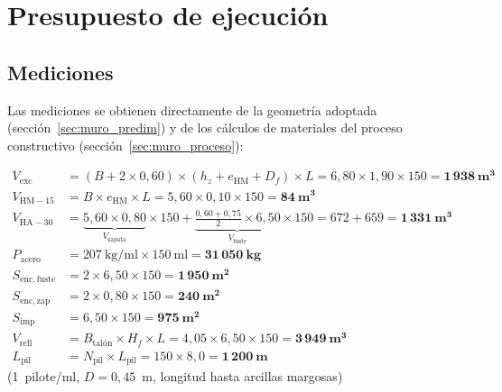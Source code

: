 \section{Presupuesto de ejecución}
\label{sec:muro_presupuesto}

\subsection{Mediciones}
\label{subsec:mediciones}

Las mediciones se obtienen directamente de la geometría adoptada
(sección~\ref{sec:muro_predim}) y de los cálculos de materiales
del proceso constructivo (sección~\ref{sec:muro_proceso}):

\begin{align*}
  V_{\mathrm{exc}}    &= (B + 2 \times 0{,}60) \times (h_z + e_{\mathrm{HM}} + D_f)
                          \times L
                       = 6{,}80 \times 1{,}90 \times 150
                       = \mathbf{1\,938~\text{m}^3} \\
  V_{\mathrm{HM-15}}  &= B \times e_{\mathrm{HM}} \times L
                       = 5{,}60 \times 0{,}10 \times 150
                       = \mathbf{84~\text{m}^3} \\
  V_{\mathrm{HA-30}}  &= \underbrace{5{,}60 \times 0{,}80}_{V_{\mathrm{zapata}}}
                         \times 150
                       + \underbrace{\tfrac{0{,}60+0{,}75}{2} \times 6{,}50}
                                    _{V_{\mathrm{fuste}}} \times 150
                       = 672 + 659 = \mathbf{1\,331~\text{m}^3} \\
  P_{\mathrm{acero}}  &= 207~\text{kg/ml} \times 150~\text{ml}
                       = \mathbf{31\,050~\text{kg}} \\
  S_{\mathrm{enc,fuste}} &= 2 \times 6{,}50 \times 150
                          = \mathbf{1\,950~\text{m}^2} \\
  S_{\mathrm{enc,zap}}   &= 2 \times 0{,}80 \times 150
                          = \mathbf{240~\text{m}^2} \\
  S_{\mathrm{imp}}    &= 6{,}50 \times 150 = \mathbf{975~\text{m}^2} \\
  V_{\mathrm{rell}}   &= B_{\mathrm{talón}} \times H_f \times L
                       = 4{,}05 \times 6{,}50 \times 150
                       = \mathbf{3\,949~\text{m}^3} \\
  L_{\mathrm{pil}}    &= N_\text{pil} \times L_\text{pil}
                       = 150 \times 8{,}0
                       = \mathbf{1\,200~\text{m}}
\end{align*}
\noindent\small(1~pilote/ml, $D=0{,}45$~m, longitud hasta arcillas margosas)\normalsize

